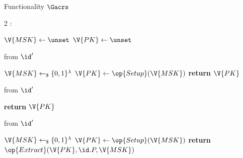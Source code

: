 \begin{interface}[nofloat]{Functionality $\Gacrs$ \\
}

{\scriptsize
\setlength{\columnsep}{1.4em}
\begin{multicols}{2}
:
\begin{algorithmic}[1]
\setcounter{contline}{0}\algcont
\State $\V{MSK} \gets \unset$
\State $\V{PK} \gets \unset$
\algsave
\end{algorithmic}
\vspace{1.4ex}

 \quad from $\id'$
\begin{algorithmic}[1]
\algcont
{}
  \State $\V{MSK} \gets_{\$} \{0,1\}^{\lambda}$ \label{ln:acrsdraw}
  \State $\V{PK} \gets \op{Setup}(\V{MSK})$
\EndIf
\State \textbf{return} $\V{PK}$ \label{ln:acrssame}
\algsave
\end{algorithmic}
\vspace{1.4ex}

 \quad from $\id'$
\begin{algorithmic}[1]
\algcont
\State \textbf{return} $\V{PK}$ \label{ln:acrsleak}
\algsave
\end{algorithmic}
\vspace{1.4ex}

\columnbreak

 \quad from $\id'$
\begin{algorithmic}[1]
\algcont
{} \label{ln:acrscorrupt}
  \State $\V{MSK} \gets_{\$} \{0,1\}^{\lambda}$
  \State $\V{PK} \gets \op{Setup}(\V{MSK})$
\EndIf
\State \textbf{return} $\op{Extract}(\V{PK}, \id.P, \V{MSK})$ \label{ln:acrsextract}
\algsave
\end{algorithmic}
\end{multicols}}
\end{interface}
